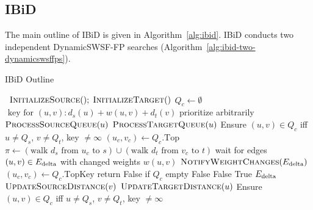 \subsection{IBiD}

The main outline of IBiD is given in Algorithm~\ref{alg:ibid}.
IBiD conducts two independent DynamicSWSF-FP searches
(Algorithm~\ref{alg:ibid-two-dynamicswsffps}).

\begin{algorithm}[t]
   \caption{IBiD Outline}
   \label{alg:ibid}
   \begin{algorithmic}[1]
       {\,}
         \State $\mbox{\sc InitializeSource}(); \; \mbox{\sc InitializeTarget}()$
         \State $Q_c \gets \emptyset$
            \Comment $\mbox{ key for } (u,v): d_s(u) + w(u,v) + d_t(v)$
         \Loop
                     \Comment prioritize arbitrarily
                  \State $\mbox{\sc ProcessSourceQueue}(u)$
               \Else
                  \State $\mbox{\sc ProcessTargetQueue}(u)$
               \EndIf
               \State Ensure $(u,v) \in Q_c$ iff
                  $u \neq Q_s$, $v \neq Q_t$, key $\neq \infty$
            \EndWhile
            \State $(u_c,v_c) \gets Q_c.\mbox{Top}$
            \State $\pi \gets
               ( \mbox{walk } d_s \mbox{ from } u_c \mbox{ to } s )
               \cup
               ( \mbox{walk } d_t \mbox{ from } v_c \mbox{ to } t )$
            \State wait for edges $(u,v) \in E_{\mbox{\scriptsize delta}}$ with changed weights $w(u,v)$
            \State $\mbox{\sc NotifyWeightChanges}(E_{\mbox{\scriptsize delta}})$
         \EndLoop
      \EndProcedure
       {\,}
         \State $(u_c,v_c) \gets Q_c.\mbox{TopKey}$
            \Comment return False if $Q_c$ empty
            \State \Return False
         \EndIf
            \State \Return False
         \EndIf
         \State \Return True
      \EndFunction
       {$E_{\mbox{\scriptsize delta}}$}
            \State $\mbox{\sc UpdateSourceDistance}(v)$
            \State $\mbox{\sc UpdateTargetDistance}(u)$
         \EndFor
         \State Ensure $(u,v) \in Q_c$ iff
            $u \neq Q_s$, $v \neq Q_t$, key $\neq \infty$
      \EndProcedure
   \end{algorithmic}
\end{algorithm}

